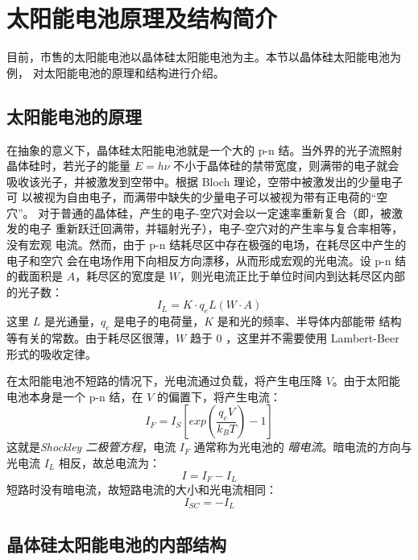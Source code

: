 \section{太阳能电池原理及结构简介}

目前，市售的太阳能电池以晶体硅太阳能电池为主。本节以晶体硅太阳能电池为例，
对太阳能电池的原理和结构进行介绍。

\subsection{太阳能电池的原理}

在抽象的意义下，晶体硅太阳能电池就是一个大的 p-n 结。当外界的光子流照射
晶体硅时，若光子的能量 $E = h\nu$ 不小于晶体硅的禁带宽度，则满带的电子就会
吸收该光子，并被激发到空带中。根据 Bloch 理论，空带中被激发出的少量电子可
以被视为自由电子，而满带中缺失的少量电子可以被视为带有正电荷的“空穴”。
对于普通的晶体硅，产生的电子-空穴对会以一定速率重新复合（即，被激发的电子
重新跃迁回满带，并辐射光子），电子-空穴对的产生率与复合率相等，没有宏观
电流。然而，由于 p-n 结耗尽区中存在极强的电场，在耗尽区中产生的电子和空穴
会在电场作用下向相反方向漂移，从而形成宏观的光电流。设 p-n 结的截面积是
$A$，耗尽区的宽度是 $W$，则光电流正比于单位时间内到达耗尽区内部的光子数：
\begin{equation} \label{eqn:LightCurrent}
I_L = K \cdot q_e L(W \cdot A)
\end{equation}
这里 $L$ 是光通量，$q_e$ 是电子的电荷量，$K$ 是和光的频率、半导体内部能带
结构等有关的常数。由于耗尽区很薄，$W$ 趋于 $0$ ，这里并不需要使用
Lambert-Beer 形式的吸收定律。

在太阳能电池不短路的情况下，光电流通过负载，将产生电压降 $V$。由于太阳能
电池本身是一个 p-n 结，在 $V$ 的偏置下，将产生电流：
\begin{equation} \label{eqn:Shockley}
I_F = I_S \left[ exp \left(\frac{q_e V}{k_B T} \right) - 1 \right]
\end{equation}
这就是\emph{Shockley 二极管方程}，电流 $I_F$ 通常称为光电池的
\emph{暗电流}。暗电流的方向与光电流 $I_L$ 相反，故总电流为：
\begin{equation} \label{eqn:TotalCurrent}
I = I_F - I_L
\end{equation}
短路时没有暗电流，故短路电流的大小和光电流相同：
\begin{equation} \label{eqn:SCCurrent}
I_{SC} = -I_L
\end{equation}

\subsection{晶体硅太阳能电池的内部结构}

